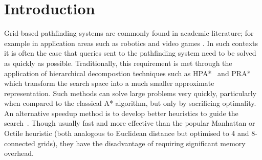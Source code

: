 \section{Introduction}
\label{sec:introduction}

Grid-based pathfinding systems are commonly found in academic literature; for
example in application areas such as robotics \cite{choset05} and video games
\cite{botea04,sturtevant05,bjornsson06}.  
In such contexts it is often the case that queries sent to the pathfinding
system need to be solved as quickly as possible.  Traditionally, this
requirement is met through the application of hierarchical decompostion
techniques such as HPA*~\cite{botea04} and PRA* ~\cite{sturtevant05} which
transform the search space into a much smaller approximate representation.
Such methods
can solve large problems very quickly, particularly when compared to the
classical A* algorithm, but only by sacrificing optimality.  An
alternative speedup method is to develop better heuristics to guide the
search~\cite{sturtevant09}.  Though usually fast and
more effective than the popular Manhattan or Octile heuristic (both
analogous to Euclidean distance but optimised to 4 and 8-connected grids), they
have the disadvantage of requiring significant memory overhead.

